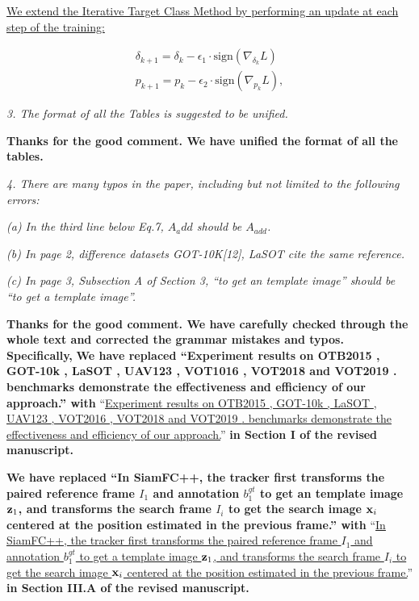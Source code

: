 \documentclass[12pt]{article}
\begin{document}
\uline{We extend the Iterative Target Class Method by performing an update at each step of the training:}

\begin{gather}
  \delta_{k+1} = \delta_{k} - \epsilon_1 \cdot \text{sign}(\nabla_{\delta_k}L)\\
  p_{k+1} = p_{k} - \epsilon_2 \cdot \text{sign}(\nabla_{p_k}L),
\end{gather}


\textit{3. The format of all the Tables is suggested to be unified.}

\textbf{Thanks for the good comment. We have unified the format of all the tables.}

\textit{4. There are many typos in the paper, including but not limited to the following errors:}

\textit{(a) In the third line below Eq.7, $A_{a}dd$ should be $A_{add}$.}

\textit{(b) In page 2, difference datasets GOT-10K[12], LaSOT \cite{LaSOT} cite the same reference.}

\textit{(c) In page 3, Subsection A of Section 3, “to get an template image” should be “to get a template image”.}

\textbf{Thanks for the good comment. We have carefully checked through the whole text and corrected the grammar mistakes and typos. Specifically,}
\textbf{We have replaced ``Experiment results on OTB2015 \cite{OTB}, GOT-10k \cite{GOT-10k}, LaSOT \cite{GOT-10k}, UAV123 \cite{UAV123}, VOT1016 \cite{VOT2016}, VOT2018 \cite{VOT2018} and VOT2019 \cite{VOT2019}. benchmarks demonstrate the effectiveness and efficiency of our approach.'' with}
``\uline{Experiment results on OTB2015 \cite{OTB}, GOT-10k \cite{GOT-10k}, LaSOT \cite{LaSOT}, UAV123 \cite{UAV123}, VOT2016 \cite{VOT2016}, VOT2018 \cite{VOT2018} and VOT2019 \cite{VOT2019}. benchmarks demonstrate the effectiveness and efficiency of our approach.}''
\textbf{in Section I of the revised manuscript.}

\textbf{We have replaced ``In SiamFC++, the tracker first transforms the paired reference frame $I_1$ and annotation $b_1^{gt}$ to get an template image $\textbf z_1$, and transforms the search frame $I_i$ to get the search image $\textbf x_i$ centered at the position estimated in the previous frame.'' with}
``\uline{In SiamFC++, the tracker first transforms the paired reference frame $I_1$ and annotation $b_1^{gt}$ to get a template image $\textbf z_1$, and transforms the search frame $I_i$ to get the search image $\textbf x_i$ centered at the position estimated in the previous frame.}''
\textbf{in Section III.A of the revised manuscript.}
\end{document}

